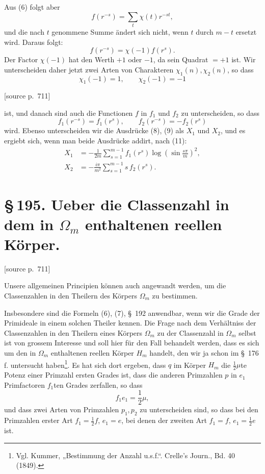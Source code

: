 \documentclass[11pt]{article}
\newcommand{\srcpage}[1]{\par\medskip\noindent\textsf{[source p.~#1]}\par\smallskip}
\begin{document}
Aus (6) folgt aber
\[
f(r^{-s})=\sum_t\chi(t)r^{-st},
\]
und die nach $t$ genommene Summe ändert sich nicht, wenn $t$ durch $m-t$ ersetzt wird. Daraus folgt:
\[
f(r^{-s})=\chi(-1)f(r^s).
\]
Der Factor $\chi(-1)$ hat den Werth $+1$ oder $-1$, da sein Quadrat $=+1$ ist. Wir unterscheiden daher jetzt zwei Arten von Charakteren $\chi_1(n),\chi_2(n)$, so dass
\begin{equation}
\chi_1(-1)=1,\qquad \chi_2(-1)=-1
\tag{10}
\end{equation}

\srcpage{711}
ist, und danach sind auch die Functionen $f$ in $f_1$ und $f_2$ zu unterscheiden, so dass
\begin{equation}
f_1(r^{-s})=f_1(r^s),\qquad f_2(r^{-s})=-f_2(r^s)
\tag{11}
\end{equation}
wird. Ebenso unterscheiden wir die Ausdrücke (8), (9) als $X_1$ und $X_2$, und es ergiebt sich, wenn man beide Ausdrücke addirt, nach (11):
\begin{equation}
\begin{aligned}
X_1&=-\frac1{2m}\sum_{s=1}^{m-1}f_1(r^s)\log\left(\sin\frac{s\pi}{m}\right)^2,\\
X_2&=-\frac{i\pi}{m^2}\sum_{s=1}^{m-1}s\,f_2(r^s).
\end{aligned}
\tag{12}
\end{equation}


\section*{\S\,195. Ueber die Classenzahl in dem in $\Omega_m$ enthaltenen reellen Körper.}

\srcpage{711}
Unsere allgemeinen Principien können auch angewandt werden, um die Classenzahlen in den Theilern des Körpers $\Omega_m$ zu bestimmen.

Insbesondere sind die Formeln (6), (7), \S~192 anwendbar, wenn wir die Grade der Primideale in einem solchen Theiler kennen. Die Frage nach dem Verhältniss der Classenzahlen in den Theilern eines Körpers $\Omega_m$ zu der Classenzahl in $\Omega_m$ selbst ist von grossem Interesse und soll hier für den Fall behandelt werden, dass es sich um den in $\Omega_m$ enthaltenen reellen Körper $H_m$ handelt, den wir ja schon im \S~176 f. untersucht haben\footnote{Vgl. Kummer, „Bestimmung der Anzahl u.s.f.“. Crelle's Journ., Bd. 40 (1849).}. Es hat sich dort ergeben, dass $q$ im Körper $H_m$ die $\frac12\mu$te Potenz einer Primzahl ersten Grades ist, dass die anderen Primzahlen $p$ in $e_1$ Primfactoren $f_1$ten Grades zerfallen, so dass
\begin{equation}
f_1e_1=\frac12\mu,
\tag{1}
\end{equation}
und dass zwei Arten von Primzahlen $p_1,p_2$ zu unterscheiden sind, so dass bei den Primzahlen erster Art $f_1=\frac12 f$, $e_1=e$, bei denen der zweiten Art $f_1=f$, $e_1=\frac12 e$ ist.
\end{document}
